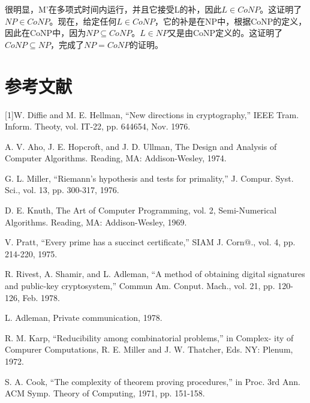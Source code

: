 \documentclass[]{article}
\begin{document}
	很明显，M'在多项式时间内运行，并且它接受L的补，因此$L\in CoNP$。这证明了$NP\in CoNP$。现在，给定任何$L\in CoNP$，它的补是在NP中，根据CoNP的定义，因此在CoNP中，因为$NP\subseteq CoNP$。$L\in NP$又是由CoNP定义的。这证明了$CoNP\subseteq NP$，完成了$NP = CoNP$的证明。
	
	
	\section*{参考文献}
    
    [1]W. Diffie and M. E. Hellman, “New directions in cryptography,” IEEE
    Tram. Inform. Theoty, vol. IT-22, pp. 644654, Nov. 1976.\par
    [2]A. V. Aho, J. E. Hopcroft, and J. D. Ullman, The Design and Analysis of
    Computer Algorithms. Reading, MA: Addison-Wesley, 1974.\par
    [3]G. L. Miller, “Riemann’s hypothesis and tests for primality,” J. Compur.
    Syst. Sci., vol. 13, pp. 300-317, 1976.\par
    [4]D. E. Knuth, The Art of Computer Programming, vol. 2, Semi-Numerical
    Algorithms. Reading, MA: Addison-Wesley, 1969.\par
    [5]V. Pratt, “Every prime has a succinct certificate,” SIAM J. Corn@., vol.
    4, pp. 214-220, 1975.\par
    [6]R. Rivest, A. Shamir, and L. Adleman, “A method of obtaining digital
    signatures and public-key cryptosystem,” Commun Am. Conput. Mach.,
    vol. 21, pp. 120-126, Feb. 1978.\par
    [7]L. Adleman, Private communication, 1978.\par
    [8]R. M. Karp, “Reducibility among combinatorial problems,” in Complex-
    ity of Compurer Computations, R. E. Miller and J. W. Thatcher, Eds.
    NY: Plenum, 1972.\par
    [9]S. A. Cook, “The complexity of theorem proving procedures,” in Proc.
    3rd Ann. ACM Symp. Theory of Computing, 1971, pp. 151-158.\par
\end{document}
